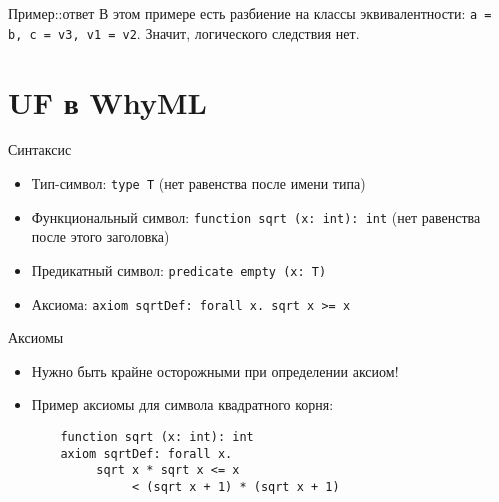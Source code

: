 \documentclass[hyperref={unicode=true}]{beamer}
\begin{document}
    \begin{frame}{Пример::ответ}
    В этом примере есть разбиение на классы эквивалентности:
    \texttt{a = b, c = v3, v1 = v2}. Значит, логического
    следствия нет.
    \end{frame}

    \section{UF в WhyML}

    \begin{frame}{Синтаксис}
    \begin{itemize}
    \item
    Тип-символ: \texttt{type T} (нет равенства после имени типа)
    \item
    Функциональный символ: \texttt{function sqrt (x: int): int}
    (нет равенства после этого заголовка)
    \item
    Предикатный символ: \texttt{predicate empty (x: T)}
    \item
    Аксиома: \texttt{axiom sqrtDef: forall x. sqrt x >= x}
    \end{itemize}
    \end{frame}
\iffalse
    \begin{frame}[fragile]{Пример неинтерпретируемых символов}
    Здесь определяются типы и функции для стеков

    \begin{lstlisting}
    type Item
    type Stack
    function empty: Stack
    function push (s: Stack, x: Item): Stack
    function pop (s: Stack): (Stack, Item)
    predicate is_empty (s: Stack)
    \end{lstlisting}
    \end{frame}
\fi
    \begin{frame}[fragile]{Аксиомы}
    \begin{itemize}
    \item
    Нужно быть крайне осторожными при определении аксиом!
    \item
    Пример аксиомы для символа квадратного корня:
    \begin{lstlisting}
    function sqrt (x: int): int
    axiom sqrtDef: forall x.
         sqrt x * sqrt x <= x
              < (sqrt x + 1) * (sqrt x + 1)
    \end{lstlisting}
    \end{itemize}
    \end{frame}
\end{document}
